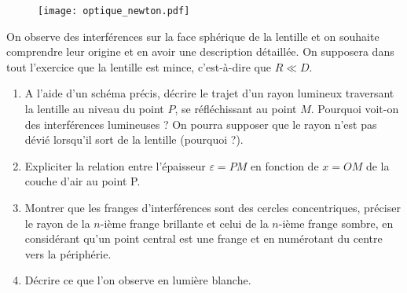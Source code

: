 \begin{figure}[h]
\centering
  \texttt{[image: optique\_newton.pdf]}
\end{figure}

On observe des interférences sur la face sphérique de la lentille et on souhaite comprendre leur origine et en avoir une description détaillée. On supposera dans tout l'exercice que la lentille est mince, c'est-à-dire que $R\ll D$. 

\begin{enumerate}

	\item A l'aide d'un schéma précis, décrire le trajet d'un rayon lumineux traversant la lentille au niveau du point $P$, se réfléchissant au point $M$. Pourquoi voit-on des interférences lumineuses ? On pourra supposer que le rayon n'est pas dévié lorsqu'il sort de la lentille (pourquoi ?).
	
	\item  Expliciter la relation entre l'épaisseur $\varepsilon=PM$ en fonction de $x=OM$ de la couche d'air au point P. 
	
	\item  Montrer que les franges d'interférences sont des cercles concentriques, préciser le rayon de la $n$-ième frange brillante et celui de la $n$-ième frange sombre, en considérant qu'un point central est une frange et en numérotant du centre vers la périphérie.
	
	\item Décrire ce que l'on observe en lumière blanche.

\end{enumerate}

\newpage

